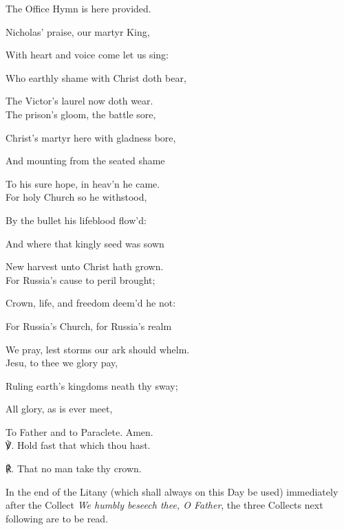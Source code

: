 \begin{rubric}
	The Office Hymn is here provided.
\end{rubric}
\begin{multicols}{2}
Nicholas' praise, our martyr King,

With heart and voice come let us sing:

Who earthly shame with Christ doth bear,

The Victor's laurel now doth wear.\\

The prison's gloom, the battle sore,

Christ's martyr here with gladness bore,

And mounting from the seated shame

To his sure hope, in heav'n he came.\\

For holy Church so he withstood,

By the bullet his lifeblood flow'd:

And where that kingly seed was sown

New harvest unto Christ hath grown.\\

For Russia's cause to peril brought;

Crown, life, and freedom deem'd he not:

For Russia's Church, for Russia's realm

We pray, lest storms our ark should whelm.\\

Jesu, to thee we glory pay,

Ruling earth's kingdoms neath thy sway;

All glory, as is ever meet,

To Father and to Paraclete. Amen.\\

    ℣. Hold fast that which thou hast.

	℟. That no man take thy crown.\\
\end{multicols}


\begin{rubric}
	In the end of the Litany (which shall always on this Day be used) immediately after the Collect \emph{We humbly beseech thee, O Father}, the three Collects next following are to be read.
\end{rubric}

